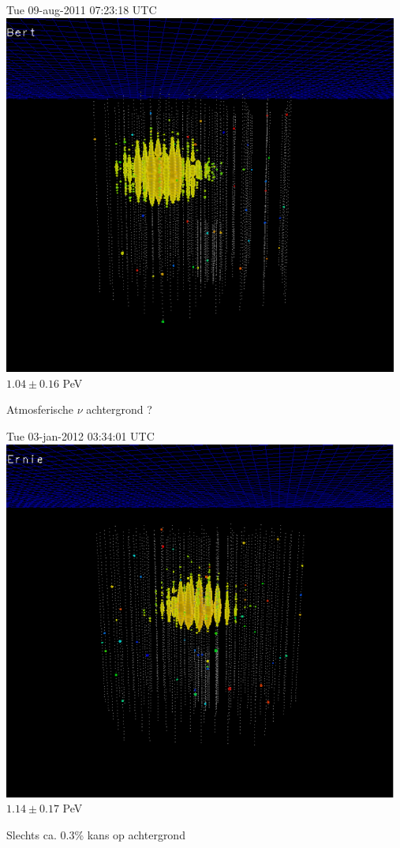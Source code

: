 \twocolumn
\begin{center}
{\blue Tue 09-aug-2011 07:23:18 UTC}\\
\includegraphics[keepaspectratio,width=13cm]{bert}\\
$1.04 \pm 0.16$ PeV
\end{center}
{\blue Atmosferische $\nu$ achtergrond ?}

\newpage

\begin{center}
{\blue Tue 03-jan-2012 03:34:01 UTC}\\
\includegraphics[keepaspectratio,width=13cm]{ernie}\\
$1.14 \pm 0.17$ PeV
\end{center}
{\blue Slechts ca. 0.3\% kans op achtergrond}

